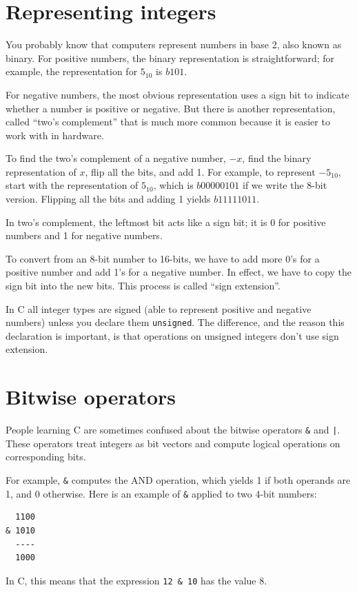 \documentclass[12pt]{book}
\begin{document}
\section{Representing integers}

You probably know that computers represent numbers in
base 2, also known as binary.  For positive numbers, the binary
representation is straightforward; for example, the representation
for $5_{10}$ is $b101$.

For negative numbers, the most obvious representation uses
a sign bit to indicate whether a number is positive or negative.
But there is another representation, called ``two's complement''
that is much more common because it is easier to work with
in hardware.

To find the two's complement of a negative number, $-x$, find
the binary representation of $x$, flip all the bits, and add 1.
For example, to represent $-5_{10}$, start with the representation
of $5_{10}$, which is $b0000 0101$ if we write the 8-bit version.
Flipping all the bits and adding 1 yields $b1111 1011$.

In two's complement, the leftmost bit acts like a sign bit;
it is 0 for positive numbers and 1 for negative numbers.

To convert from an 8-bit number to 16-bits, we have to add
more 0's for a positive number and add 1's for a negative number.
In effect, we have to copy the sign bit into the new bits.
This process is called ``sign extension''.

In C all integer types are signed (able to represent positive and
negative numbers) unless you declare them {\tt unsigned}.  The
difference, and the reason this declaration is important, is that
operations on unsigned integers don't use sign extension.


\section{Bitwise operators}

People learning C are sometimes confused
about the bitwise operators \verb"&" and \verb"|".  These
operators treat integers as bit vectors and compute logical
operations on corresponding bits.

For example, \verb"&" computes the AND operation, which yields
1 if both operands are 1, and 0 otherwise.  Here is an example
of \verb"&" applied to two 4-bit numbers:
%
\begin{verbatim}
  1100
& 1010
  ----
  1000
\end{verbatim}
%
In C, this means that the expression \verb"12 & 10" has the
value 8.
\end{document}
